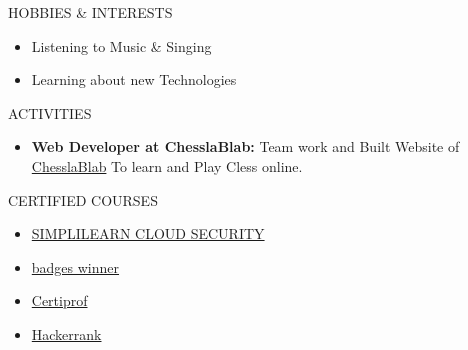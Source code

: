 \documentclass{resume}
\begin{document}
\begin{rSection}{HOBBIES \& INTERESTS}
    \begin{itemize}
        \item Listening to Music \& Singing
              \vspace{-0.4em}
        \item Learning about new Technologies
    \end{itemize}
\end{rSection}
\vspace{-0.4em}

\begin{rSection}{ACTIVITIES}
    \begin{itemize}
        \item \textbf{Web Developer at ChesslaBlab:} Team work and Built Website of {\href{https://github.com/chesslablab}{ChesslaBlab}}  To learn and Play Cless online.
    \end{itemize}
\end{rSection}

\begin{rSection}{CERTIFIED COURSES}
    \begin{itemize}
        \item \href{https://simpli-web.app.link/e/xZ3GpSgkkMb}{SIMPLILEARN CLOUD SECURITY}
        \item \href{https://www.credly.com/badges/6025a592-85b2-4f2b-ae92-93cf83aa0ef6}{badges winner}
        \item \href{https://app.kajabi.com/certificates/1d00b4fe}{Certiprof}
        \item \href{https://www.hackerrank.com/certificates/79c09382a64c}{Hackerrank}
    \end{itemize}
    \vspace{-0.4em}
\end{rSection}
\end{document}
